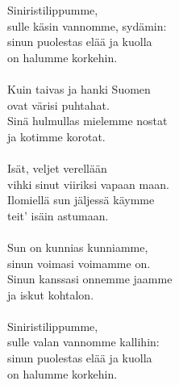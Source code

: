 
            Siniristilippumme, \\
            sulle käsin vannomme, sydämin: \\
            sinun puolestas elää ja kuolla \\
            on halumme korkehin. \\
\hspace{10mm} \\
            Kuin taivas ja hanki Suomen \\
            ovat värisi puhtahat. \\
            Sinä hulmullas mielemme nostat \\
            ja kotimme korotat. \\
\hspace{10mm} \\
            Isät, veljet verellään \\
            vihki sinut viiriksi vapaan maan. \\
            Ilomiellä sun jäljessä käymme \\
            teit’ isäin astumaan. \\
\hspace{10mm} \\
            Sun on kunnias kunniamme, \\
            sinun voimasi voimamme on. \\
            Sinun kanssasi onnemme jaamme \\
            ja iskut kohtalon. \\
\hspace{10mm} \\
            Siniristilippumme, \\
            sulle valan vannomme kallihin: \\
            sinun puolestas elää ja kuolla \\
            on halumme korkehin. \\
